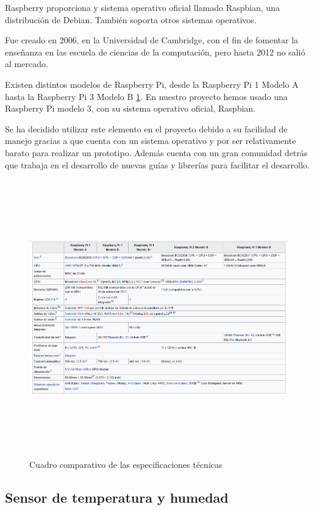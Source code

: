 Raspberry proporciona y sistema operativo oficial llamado Raspbian, una distribución de Debian. También soporta otros sistemas operativos.
 
Fue creado en 2006, en la Universidad de Cambridge, con el fin de fomentar la enseñanza en las escuela de ciencias de la computación, pero hasta 2012 no salió al mercado.

Existen distintos modelos de Raspberry Pi, desde la Raspberry Pi 1 Modelo A hasta la Raspberry Pi 3 Modelo B \ref{types}.
En nuestro proyecto hemos usado una Raspberry Pi modelo 3, con su sistema operativo oficial, Raspbian.

Se ha decidido utilizar este elemento en el proyecto debido a su facilidad de manejo gracias a que cuenta con un sistema operativo y por ser relativamente barato para realizar un prototipo. Además cuenta con un gran comunidad detrás que trabaja en el desarrollo de nuevas guías y librerías para facilitar el desarrollo. 

\begin{figure}[htb]
	\begin{center}
		\includegraphics[width=17cm,height=12cm]{figures/Cuadro_Tipos_Raspberry.png}
		\caption{Cuadro comparativo de las especificaciones técnicas}
	\end{center}

	\label{types}
\end{figure}

\subsection*{Sensor de temperatura y humedad}

